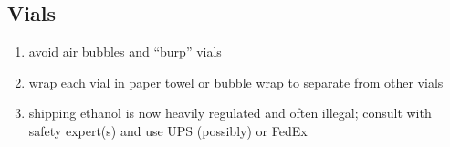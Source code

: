 \documentclass[letterpaper, 11pt]{article}
\begin{document}
\subsection{Vials}
\begin{enumerate}
\item avoid air bubbles and “burp” vials
\item wrap each vial in paper towel or bubble wrap to separate from other vials
\item shipping ethanol is now heavily regulated and often illegal; consult with safety expert(s) and use UPS (possibly) or FedEx
\end{enumerate}




\end{document}
